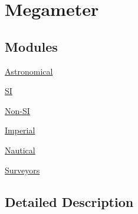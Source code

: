 \hypertarget{group___e_g_x_math-_conversions-_length_conversions-_s_i-_megameter}{}\section{Megameter}
\label{group___e_g_x_math-_conversions-_length_conversions-_s_i-_megameter}
\subsection*{Modules}
\begin{DoxyCompactItemize}
\item 
\mbox{\hyperlink{group___e_g_x_math-_conversions-_length_conversions-_s_i-_megameter-_astronomical}{Astronomical}}
\item 
\mbox{\hyperlink{group___e_g_x_math-_conversions-_length_conversions-_s_i-_megameter-_s_i}{SI}}
\item 
\mbox{\hyperlink{group___e_g_x_math-_conversions-_length_conversions-_s_i-_megameter-_non-_s_i}{Non-\/\+SI}}
\item 
\mbox{\hyperlink{group___e_g_x_math-_conversions-_length_conversions-_s_i-_megameter-_imperial}{Imperial}}
\item 
\mbox{\hyperlink{group___e_g_x_math-_conversions-_length_conversions-_s_i-_megameter-_nautical}{Nautical}}
\item 
\mbox{\hyperlink{group___e_g_x_math-_conversions-_length_conversions-_s_i-_megameter-_surveyors}{Surveyors}}
\end{DoxyCompactItemize}


\subsection{Detailed Description}
